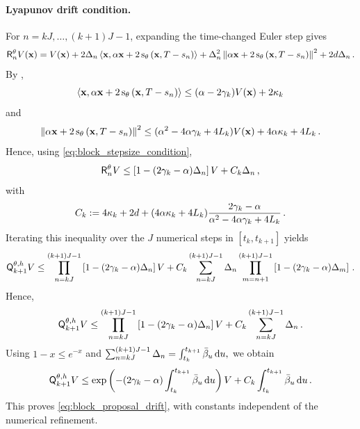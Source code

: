 \documentclass[11pt]{article}
\theoremstyle{plain}
\theoremstyle{definition}
\theoremstyle{remark}
\begin{document}
\paragraph{Lyapunov drift condition.} For $n=kJ,\ldots,(k+1)J-1$, expanding the time-changed Euler step gives
\begin{align*}
\mathsf R_n^\theta V(\x) = V(\x) + 2 \Delta_n \dotprod{\x}{ \isvp\x+2\scorenet[T-s_n][\x][\theta]} + \Delta_n^2 \normEc{\isvp\x+2\scorenet[T-s_n][\x][\theta]}^2 + 2\xdim\Delta_n  \eqsp.
\end{align*}
By ,
$$
\dotprod{\x}{ \isvp\x+2\scorenet[T-s_n][\x][\theta]} \le (\isvp-2\gamma_k)V(\x)+2\kappa_k
$$
and
$$
\normEc{\isvp\x+2\scorenet[T-s_n][\x][\theta]}^2 \le (\isvp^2-4\isvp\gamma_k+4L_k)V(\x) + 4 \isvp \kappa_k + 4 L_k \eqsp.
$$
Hence, using \eqref{eq:block_stepsize_condition},
$$
\mathsf R_n^\theta V \le \left[1-(2\gamma_k-\alpha)\Delta_n\right]V + C_k \Delta_n \,,
$$
with 
\begin{equation} \label{eq:def:C_k}
C_k := 4 \kappa_k + 2 d + (4\alpha\kappa_k+4L_k) \frac{2\gamma_k-\alpha}{\alpha^2-4\alpha\gamma_k+4L_k} \,.
\end{equation}
Iterating this inequality over the $J$ numerical steps in
$[t_k,t_{k+1}]$ yields
\begin{align*}
\mk{k+1}[\theta,h]V \le \prod_{n=kJ}^{(k+1)J-1} \left[1-(2\gamma_k-\isvp)\Delta_n\right]V + C_k \sum_{n=kJ}^{(k+1)J-1} \Delta_n \prod_{m=n+1}^{(k+1)J-1} \left[1-(2\gamma_k-\isvp)\Delta_m\right] \eqsp.
\end{align*}
Hence,
$$
\mk{k+1}[\theta,h]V \le \prod_{n=kJ}^{(k+1)J-1} \left[1-(2\gamma_k-\isvp)\Delta_n\right]V + C_k \sum_{n=kJ}^{(k+1)J-1}\Delta_n \eqsp.
$$
Using $1-x\le e^{-x}$ and $\sum_{n=kJ}^{(k+1)J-1}\Delta_n = \int_{t_k}^{t_{k+1}}\bar{\beta}_{u}\,\mathrm{d} u,$ we obtain
\begin{equation*}
\mk{k+1}[\theta,h]V \le \exp\left( -(2\gamma_k-\isvp) \int_{t_k}^{t_{k+1}}\bwdnoisesch{u}\,\rmd u \right) V + C_k \int_{t_k}^{t_{k+1}} \bwdnoisesch{u}\,\rmd u \eqsp.
\end{equation*}
This proves \eqref{eq:block_proposal_drift}, with constants independent
of the numerical refinement.
\end{document}
